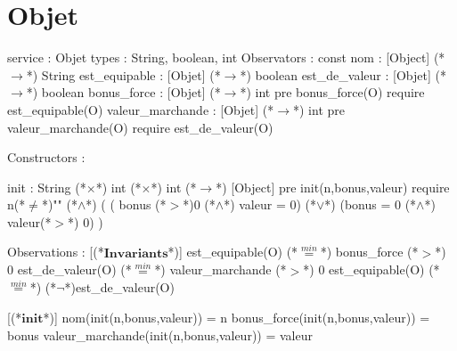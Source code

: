 \documentclass[a4paper, 11pt, notitlepage]{report}
\newcommand{\specB}[1]{\textbf{#1}}
\begin{document}
\section{Objet}
\begin{Spe}


service : Objet 
types : String, boolean, int
Observators :
	const nom : [Object] (*$\rightarrow$*) String
	est_equipable : [Objet] (*$\rightarrow$*) boolean 
	est_de_valeur : [Objet] (*$\rightarrow$*) boolean
	bonus_force : [Objet] (*$\rightarrow$*) int
		pre bonus_force(O) require est_equipable(O) 
	valeur_marchande : [Objet] (*$\rightarrow$*) int
		pre valeur_marchande(O) require est_de_valeur(O)

Constructors :

	init : String (*$\times$*) int (*$\times$*) int (*$\rightarrow$*) [Object] 
		pre init(n,bonus,valeur) require n(*$\ne$*)"" (*$\land$*) ( ( bonus (*$>$*)0 (*$\land$*) valeur = 0) (*$\lor$*) (bonus = 0 (*$\land$*) valeur(*$>$*) 0) ) 
		
Observations : 
	 [(*$\specB{Invariants}$*)]
		est_equipable(O) (*$\stackrel{min}{=}$*) bonus_force (*$>$*) 0
		est_de_valeur(O) (*$\stackrel{min}{=}$*) valeur_marchande (*$>$*) 0
		est_equipable(O) (*$\stackrel{min}{=}$*) (*$\lnot$*)est_de_valeur(O)
		
	 [(*$\specB{init}$*)]
		nom(init(n,bonus,valeur)) = n 
		bonus_force(init(n,bonus,valeur)) = bonus 
		valeur_marchande(init(n,bonus,valeur)) = valeur 

\end{Spe}
\end{document}
